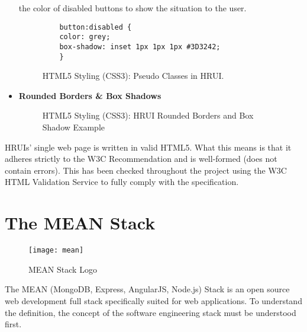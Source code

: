\begin{itemize}
  the color of disabled buttons to show the situation to the user.
  \begin{figure}[h]
    \centering
    \begin{verbatim}
    button:disabled {
    color: grey;
    box-shadow: inset 1px 1px 1px #3D3242;
    }
    \end{verbatim}
    \caption{HTML5 Styling (CSS3): Pseudo Classes in HRUI.}
  \end{figure}
  \item \textbf{Rounded Borders \& Box Shadows}
  \begin{figure}[H]
    \begin{center}
    \end{center}
    \caption{HTML5 Styling (CSS3): HRUI Rounded Borders and Box Shadow Example}
  \end{figure}
\end{itemize}

HRUIs' single web page is written in valid HTML5. What this means is that it adheres strictly to the W3C Recommendation and is well-formed (does not contain errors). This has been checked throughout the project using the W3C HTML Validation Service\cite{w3cvalidation} to fully comply with the specification.
\section{The MEAN Stack} \label{TheMEANStack}
\begin{figure}[H]
    \begin{center}
      \texttt{[image: mean]}
    \end{center}
    \caption{MEAN Stack Logo}
  \end{figure}
The MEAN (MongoDB, Express, AngularJS, Node.js) Stack is an open source web development full stack specifically suited for web applications. To understand the definition, the concept of the software engineering stack must be understood first.\\

